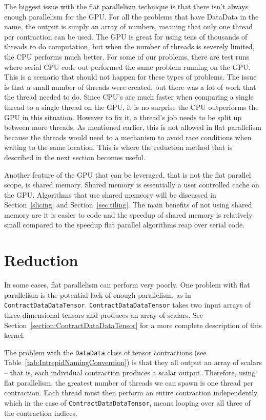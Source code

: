 The biggest issue with the flat parallelism technique is that there isn't
always enough parallelism for the GPU. For all the problems that have DataData
in the name, the output is simply an array of numbers, meaning that only one
thread per contraction can be used. The GPU is great for using tens of
thousands of threads to do computation, but when the number of threads is
severely limited, the CPU performs much better. For some of our problems, there
are test runs where serial CPU code out performed the same problem running on
the GPU. This is a scenario that should not happen for these types of problems.
The issue is that a small number of threads were created, but there was a lot
of work that the thread needed to do. Since CPU's are much faster when
comparing a single thread to a single thread on the GPU, it is no surprise the
CPU outperforms the GPU in this situation. However to fix it, a thread's job
needs to be split up between more threads. As mentioned earlier, this is not
allowed in flat parallelism because the threads would need to a mechanism to
avoid race conditions when writing to the same location. This is where the
reduction method that is described in the next section becomes useful.

Another feature of the GPU that can be leveraged, that is not the flat parallel
scope, is shared memory. Shared memory is essentially a user controlled cache
on the GPU. Algorithms that use shared memeory will be discussed in
Section~\ref{slicing} and Section~\ref{sec:tiling}. The main benefits of not
using shared memory are it is easier to code and the speedup of shared memory
is relatively small compared to the speedup flat parallel algorithms reap over
serial code. 

\section{Reduction} \label{sec:reduction} In some cases, flat parallelism can
perform very poorly.  One problem with flat parallelism is the potential lack
of enough parallelism, as in \texttt{ContractDataDataTensor}.
\texttt{ContractDataDataTensor} takes two input arrays of three-dimensional
tensors and produces an array of scalars.  See
Section~\ref{section:ContractDataDataTensor} for a more complete description of
this kernel.

The problem with the \texttt{DataData} class of tensor contractions (see
Table~\ref{tab:IntrepidNamingConvention}) is that they all output an array of
scalars -- that is, each individual contraction produces a scalar output.
Therefore, using flat parallelism, the greatest number of threads we can spawn
is one thread per contraction.  Each thread must then perform an entire
contraction independently, which in the case of
\texttt{ContractDataDataTensor}, means looping over all three of the
contraction indices.

